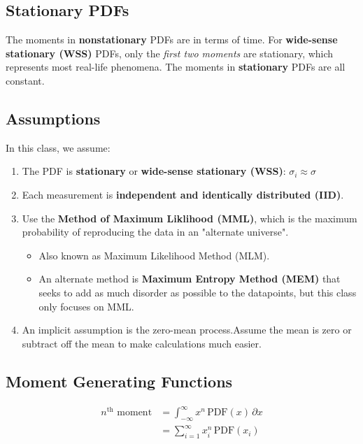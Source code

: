 \subsection{Stationary PDFs}

The moments in \textbf{nonstationary} PDFs are in terms of time. For \textbf{wide-sense stationary (WSS)} PDFs, only the \emph{first two moments} are stationary, which represents most real-life phenomena. The moments in \textbf{stationary} PDFs are all constant.

\subsection{Assumptions}

In this class, we assume:

\begin{enumerate}
    \item The PDF is \textbf{stationary} or \textbf{wide-sense stationary (WSS)}: $\sigma_i \approx \sigma$
    \item Each measurement is \textbf{independent and identically distributed (IID)}.
    \item Use the \textbf{Method of Maximum Liklihood (MML)}, which is the maximum probability of reproducing the data in an "alternate universe".
          \begin{itemize}
              \item Also known as Maximum Likelihood Method (MLM).
              \item An alternate method is \textbf{Maximum Entropy Method (MEM)} that seeks to add as much disorder as possible to the datapoints, but this class only focuses on MML.
          \end{itemize}
    \item An implicit assumption is the zero-mean process.Assume the mean is zero or subtract off the mean to make calculations much easier.
\end{enumerate}

\subsection{Moment Generating Functions}

\begin{align*}
    n^\text{th} \text{ moment} & = \int_{-\infty}^{\infty} x^n \, \text{PDF}(x) \, \partial x \tag{continuous} \\
                               & = \sum_{i=1}^{\infty} x_i^n \, \text{PDF}(x_i) \tag{discrete}
\end{align*}

